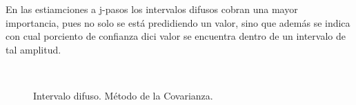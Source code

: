 \documentclass[12pt]{article}
\begin{document}
\begin{itemize}
En las estiamciones a j-pasos los intervalos difusos cobran una mayor importancia, pues no solo se está predidiendo un valor, sino que además se indica con cual porciento de confianza dici valor se encuentra dentro de un intervalo de tal amplitud.

\begin{figure}[h!]
		\centering
		\captionsetup{justification=centering}
        \\
		\caption{Intervalo difuso. Método de la Covarianza.}
		\label{f_P1Covarianza}
\end{figure}


\end{itemize}
\end{document}
